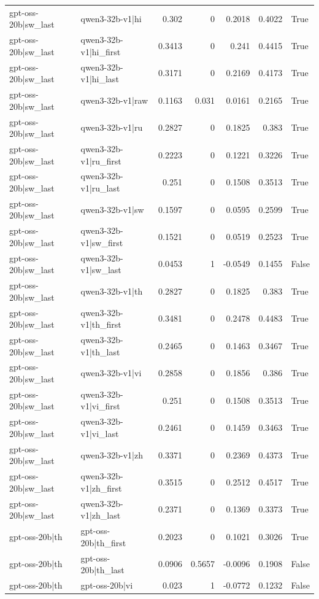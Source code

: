 \begin{table}
\begin{tabular}{l l r r r r l}
gpt-oss-20b|sw_last & qwen3-32b-v1|hi & 0.302 & 0 & 0.2018 & 0.4022 & True \\
gpt-oss-20b|sw_last & qwen3-32b-v1|hi_first & 0.3413 & 0 & 0.241 & 0.4415 & True \\
gpt-oss-20b|sw_last & qwen3-32b-v1|hi_last & 0.3171 & 0 & 0.2169 & 0.4173 & True \\
gpt-oss-20b|sw_last & qwen3-32b-v1|raw & 0.1163 & 0.031 & 0.0161 & 0.2165 & True \\
gpt-oss-20b|sw_last & qwen3-32b-v1|ru & 0.2827 & 0 & 0.1825 & 0.383 & True \\
gpt-oss-20b|sw_last & qwen3-32b-v1|ru_first & 0.2223 & 0 & 0.1221 & 0.3226 & True \\
gpt-oss-20b|sw_last & qwen3-32b-v1|ru_last & 0.251 & 0 & 0.1508 & 0.3513 & True \\
gpt-oss-20b|sw_last & qwen3-32b-v1|sw & 0.1597 & 0 & 0.0595 & 0.2599 & True \\
gpt-oss-20b|sw_last & qwen3-32b-v1|sw_first & 0.1521 & 0 & 0.0519 & 0.2523 & True \\
gpt-oss-20b|sw_last & qwen3-32b-v1|sw_last & 0.0453 & 1 & -0.0549 & 0.1455 & False \\
gpt-oss-20b|sw_last & qwen3-32b-v1|th & 0.2827 & 0 & 0.1825 & 0.383 & True \\
gpt-oss-20b|sw_last & qwen3-32b-v1|th_first & 0.3481 & 0 & 0.2478 & 0.4483 & True \\
gpt-oss-20b|sw_last & qwen3-32b-v1|th_last & 0.2465 & 0 & 0.1463 & 0.3467 & True \\
gpt-oss-20b|sw_last & qwen3-32b-v1|vi & 0.2858 & 0 & 0.1856 & 0.386 & True \\
gpt-oss-20b|sw_last & qwen3-32b-v1|vi_first & 0.251 & 0 & 0.1508 & 0.3513 & True \\
gpt-oss-20b|sw_last & qwen3-32b-v1|vi_last & 0.2461 & 0 & 0.1459 & 0.3463 & True \\
gpt-oss-20b|sw_last & qwen3-32b-v1|zh & 0.3371 & 0 & 0.2369 & 0.4373 & True \\
gpt-oss-20b|sw_last & qwen3-32b-v1|zh_first & 0.3515 & 0 & 0.2512 & 0.4517 & True \\
gpt-oss-20b|sw_last & qwen3-32b-v1|zh_last & 0.2371 & 0 & 0.1369 & 0.3373 & True \\
gpt-oss-20b|th & gpt-oss-20b|th_first & 0.2023 & 0 & 0.1021 & 0.3026 & True \\
gpt-oss-20b|th & gpt-oss-20b|th_last & 0.0906 & 0.5657 & -0.0096 & 0.1908 & False \\
gpt-oss-20b|th & gpt-oss-20b|vi & 0.023 & 1 & -0.0772 & 0.1232 & False \\

\end{tabular}
\end{table}
